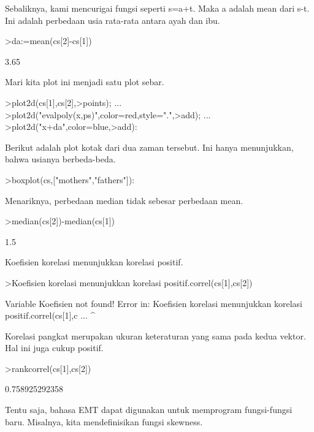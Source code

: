 \documentclass{article}
\begin{document}
\begin{eulernotebook}
\begin{eulercomment}
\begin{eulercomment}
\begin{eulercomment}
Sebaliknya, kami mencurigai fungsi seperti s=a+t. Maka a adalah mean
dari s-t. Ini adalah perbedaan usia rata-rata antara ayah dan ibu.
\end{eulercomment}
\begin{eulerprompt}
>da:=mean(cs[2]-cs[1])
\end{eulerprompt}
\begin{euleroutput}
  3.65
\end{euleroutput}
\begin{eulercomment}
Mari kita plot ini menjadi satu plot sebar.
\end{eulercomment}
\begin{eulerprompt}
>plot2d(cs[1],cs[2],>points);  ...
>plot2d("evalpoly(x,ps)",color=red,style=".",>add);  ...
>plot2d("x+da",color=blue,>add):
\end{eulerprompt}
\begin{eulercomment}
Berikut adalah plot kotak dari dua zaman tersebut. Ini hanya
menunjukkan, bahwa usianya berbeda-beda.
\end{eulercomment}
\begin{eulerprompt}
>boxplot(cs,["mothers","fathers"]):
\end{eulerprompt}
\begin{eulercomment}
Menariknya, perbedaan median tidak sebesar perbedaan mean.
\end{eulercomment}
\begin{eulerprompt}
>median(cs[2])-median(cs[1])
\end{eulerprompt}
\begin{euleroutput}
  1.5
\end{euleroutput}
\begin{eulercomment}
Koefisien korelasi menunjukkan korelasi positif.
\end{eulercomment}
\begin{eulerprompt}
>Koefisien korelasi menunjukkan korelasi positif.correl(cs[1],cs[2])
\end{eulerprompt}
\begin{euleroutput}
  Variable Koefisien not found!
  Error in:
  Koefisien korelasi menunjukkan korelasi positif.correl(cs[1],c ...
            ^
\end{euleroutput}
\begin{eulercomment}
Korelasi pangkat merupakan ukuran keteraturan yang sama pada kedua
vektor. Hal ini juga cukup positif.
\end{eulercomment}
\begin{eulerprompt}
>rankcorrel(cs[1],cs[2])
\end{eulerprompt}
\begin{euleroutput}
  0.758925292358
\end{euleroutput}
\begin{eulercomment}
Tentu saja, bahasa EMT dapat digunakan untuk memprogram fungsi-fungsi
baru. Misalnya, kita mendefinisikan fungsi skewness.


\end{eulercomment}
\end{eulercomment}
\end{eulercomment}
\end{eulernotebook}
\end{document}
